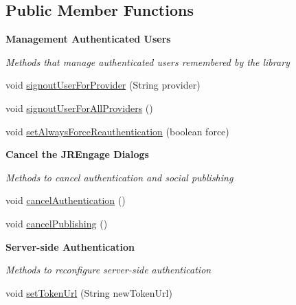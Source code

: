 \subsection*{Public Member Functions}
\begin{Indent}{\bf Management Authenticated Users}\par
{\em \label{_amgrp4247d2361fbfb57c620ed69782a50c95}
 Methods that manage authenticated users remembered by the library }\begin{DoxyCompactItemize}
\item 
void \hyperlink{classcom_1_1janrain_1_1android_1_1engage_1_1_j_r_engage_a8347fa6572b022b8730a5c2808c31b0e}{signoutUserForProvider} (String provider)
\item 
void \hyperlink{classcom_1_1janrain_1_1android_1_1engage_1_1_j_r_engage_a2040cb9371fd98882671dac6907ea548}{signoutUserForAllProviders} ()
\item 
void \hyperlink{classcom_1_1janrain_1_1android_1_1engage_1_1_j_r_engage_a3e93234a3a57a72318b41a101395abde}{setAlwaysForceReauthentication} (boolean force)
\end{DoxyCompactItemize}
\end{Indent}
\begin{Indent}{\bf Cancel the JREngage Dialogs}\par
{\em \label{_amgrpd07ee85d05cc5dd13dd0e31682479a39}
 Methods to cancel authentication and social publishing }\begin{DoxyCompactItemize}
\item 
void \hyperlink{classcom_1_1janrain_1_1android_1_1engage_1_1_j_r_engage_a06b51503fb14cb55d99a138a2778fd42}{cancelAuthentication} ()
\item 
void \hyperlink{classcom_1_1janrain_1_1android_1_1engage_1_1_j_r_engage_a88a1a97162c4a01a57b2adccafc82be7}{cancelPublishing} ()
\end{DoxyCompactItemize}
\end{Indent}
\begin{Indent}{\bf Server-\/side Authentication}\par
{\em \label{_amgrp1fc6cae7bdf84f91a0bad45f5891f15e}
 Methods to reconfigure server-\/side authentication }\begin{DoxyCompactItemize}
\item 
void \hyperlink{classcom_1_1janrain_1_1android_1_1engage_1_1_j_r_engage_ac9b1ed5b6fc916ea7f7cb33177122d05}{setTokenUrl} (String newTokenUrl)
\end{DoxyCompactItemize}
\end{Indent}
